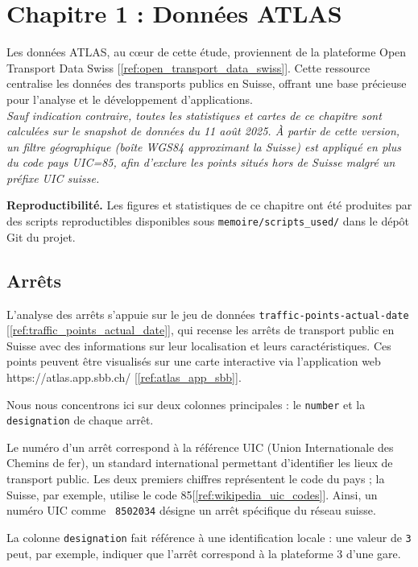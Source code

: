 \chapter{Chapitre 1 : Données ATLAS}

Les données ATLAS, au cœur de cette étude, proviennent de la plateforme Open Transport Data Swiss [\ref{ref:open_transport_data_swiss}]. Cette ressource centralise les données des transports publics en Suisse, offrant une base précieuse pour l’analyse et le développement d’applications.\\
\textit{Sauf indication contraire, toutes les statistiques et cartes de ce chapitre sont calculées sur le snapshot de données du 11 août 2025. À partir de cette version, un filtre géographique (boîte WGS84 approximant la Suisse) est appliqué en plus du code pays UIC=85, afin d'exclure les points situés hors de Suisse malgré un préfixe UIC suisse.}

\medskip
\noindent\textbf{Reproductibilité.} Les figures et statistiques de ce chapitre ont été produites par des scripts reproductibles disponibles sous \texttt{memoire/scripts\_used/} dans le dépôt Git du projet.

\section{Arrêts}

L'analyse des arrêts s'appuie sur le jeu de données \texttt{traffic-points-actual-date} [\ref{ref:traffic_points_actual_date}], qui recense les arrêts de transport public en Suisse avec des informations sur leur localisation et leurs caractéristiques. Ces points peuvent être visualisés sur une carte interactive via l’application web https://atlas.app.sbb.ch/ [\ref{ref:atlas_app_sbb}].

Nous nous concentrons ici sur deux colonnes principales : le \texttt{number} et la \texttt{designation} de chaque arrêt.

Le numéro d’un arrêt correspond à la référence UIC (Union Internationale des Chemins de fer), un standard international permettant d’identifier les lieux de transport public. Les deux premiers chiffres représentent le code du pays ; la Suisse, par exemple, utilise le code 85[\ref{ref:wikipedia_uic_codes}]. Ainsi, un numéro UIC comme \texttt{ 8502034} désigne un arrêt spécifique du réseau suisse.

La colonne \texttt{designation} fait référence à une identification locale : une valeur de \texttt{3} peut, par exemple, indiquer que l’arrêt correspond à la plateforme 3 d’une gare.

